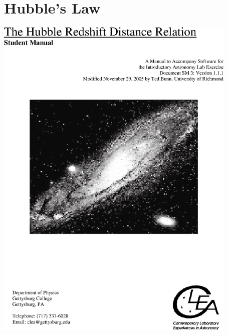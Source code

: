 \chapter{Hubble's Law}

\includegraphics[height=6.3in,trim=-1in -3in 0 0]{wordtops/hubble1.eps}
\vfil\eject

